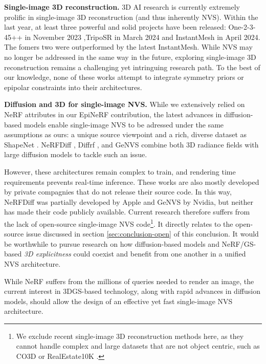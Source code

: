 \noindent \textbf{Single-image 3D reconstruction.} 3D \ac{AI} research is currently extremely prolific in single-image 3D reconstruction (and thus inherently \ac{NVS}). Within the last year, at least three powerful and solid projects have been released:  One-2-3-45++ \citep{liu2023one2345++} in November 2023 ,TripoSR \citep{tochilkin2024triposr} in March 2024 and InstantMesh \citep{xu2024instantmesh} in April 2024. The fomers two were outperformed by the latest InstantMesh. While \ac{NVS} may no longer be addressed in the same way in the future, exploring single-image 3D reconstruction remains a challenging yet intringuing research path. To the best of our knowledge, none of these works attempt to integrate symmetry priors or epipolar constraints into their architectures. 

\noindent \textbf{Diffusion and 3D for single-image NVS.} While we extensively relied on \ac{NeRF} attributes in our EpiNeRF contribution, the latest advances in diffusion-based models enable single-image \ac{NVS} to be adressed under the same assumptions as ours: a unique source viewpoint and a rich, diverse dataset as ShapeNet \citep{chang2015shapenet}. NeRFDiff \citep{gu2023nerfdiff}, Diffrf \citep{muller2023diffrf}, and GeNVS \citep{chan2023genvs} combine both 3D radiance fields with large diffusion models to tackle such an issue. 

However, these architectures remain complex to train, and rendering time requirements prevents real-time inference. These works are also mostly developed by private compagnies that do not release their source code. In this way, NeRFDiff was partially developed by Apple and GeNVS by Nvidia, but neither has made their code publicly available. Current research therefore suffers from the lack of open-source single-image \ac{NVS} code\footnote{We exclude recent single-image 3D reconstruction methods here, as they cannot handle complex and large datasets that are not object centric, such as CO3D \citep{reizenstein2021common} or RealEstate10K \citep{zhou2018stereo}.}. It directly relates to the open-source issue discussed in section \ref{sec:conclusion-open} of this conclusion. It would be worthwhile to pursue research on how diffusion-based models and \ac{NeRF}/\ac{GS}-based \textit{3D explicitness} could coexist and benefit from one another in a unified \ac{NVS} architecture.

While \ac{NeRF} suffers from the millions of queries needed to render an image, the current interest in 3D\ac{GS}-based technology, along with rapid advances in diffusion models, should allow the design of an effective yet fast single-image \ac{NVS} architecture.

